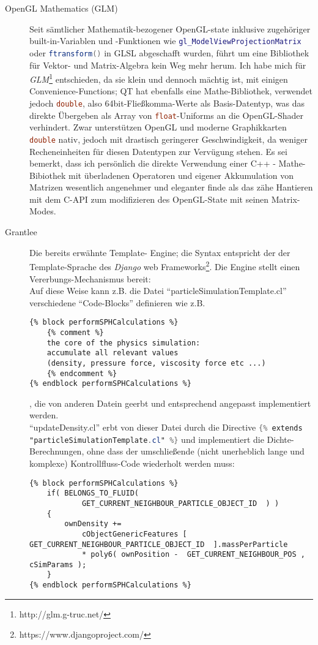 \begin{description}
    	
    	\item[OpenGL Mathematics (GLM)]
    	Seit sämtlicher Mathematik-bezogener OpenGL-state inklusive zugehöriger built-in-Variablen und -Funktionen
    	wie \lstinline[language=GLSL]|gl_ModelViewProjectionMatrix| oder
    	\lstinline[language=GLSL]|ftransform()|
    	in GLSL abgeschafft wurden, führt um eine Bibliothek für Vektor- und Matrix-Algebra kein Weg mehr herum.
    	Ich habe mich für \emph{GLM}\footnote{http://glm.g-truc.net/} entschieden, da sie klein und dennoch mächtig ist,
    	mit einigen Convenience-Functions; QT hat ebenfalls eine Mathe-Bibliothek, verwendet jedoch
    	\lstinline[language=C]|double|, also 64bit-Fließkomma-Werte als Basis-Datentyp, was das direkte Übergeben
    	als Array von \lstinline[language=C]|float|-Uniforms an die OpenGL-Shader verhindert. Zwar unterstützen OpenGL
    	und moderne Graphikkarten \lstinline[language=C]|double| nativ, jedoch mit drastisch geringerer Geschwindigkeit,
    	da weniger Recheneinheiten für diesen Datentypen zur Vervügung stehen.
    	Es sei bemerkt, dass ich persönlich die direkte Verwendung einer C++ - Mathe-Bibiothek mit überladenen Operatoren
    	und eigener Akkumulation von Matrizen wesentlich angenehmer und eleganter finde als das zähe Hantieren
    	mit dem C-API zum modifizieren des OpenGL-State mit seinen Matrix-Modes.
    	
    	\item[Grantlee]
       		Die bereits erwähnte Template- Engine; die Syntax entspricht der der Template-Sprache des 
       		\emph{Django} web Frameworks\footnote{https://www.djangoproject.com/}.
       		Die Engine stellt einen Vererbungs-Mechanismus bereit:\\
       		Auf diese Weise kann z.B. die Datei "`particleSimulationTemplate.cl"' verschiedene "`Code-Blocks"'
       		definieren wie z.B.
       		\lstset{language=GLSL} 
       		\begin{lstlisting}
{% block performSPHCalculations %}
	{% comment %}
	the core of the physics simulation: 
	accumulate all relevant values 
	(density, pressure force, viscosity force etc ...)
	{% endcomment %}               
{% endblock performSPHCalculations %}
       		\end{lstlisting}
       		, die von anderen Datein geerbt und entsprechend angepasst implementiert werden.\\
       		"`updateDensity.cl"' erbt von dieser Datei durch die Directive
       		\lstinline[language=GLSL]|{% extends "particleSimulationTemplate.cl" %}| 
       		und implementiert die Dichte-Berechnungen, 
       		ohne dass der umschließende (nicht unerheblich lange und komplexe) Kontrollfluss-Code wiederholt werden muss:
       		\begin{lstlisting}
{% block performSPHCalculations %}
	if( BELONGS_TO_FLUID(
			GET_CURRENT_NEIGHBOUR_PARTICLE_OBJECT_ID  ) )
	{
		ownDensity +=                   
			cObjectGenericFeatures [ GET_CURRENT_NEIGHBOUR_PARTICLE_OBJECT_ID  ].massPerParticle
			* poly6( ownPosition -  GET_CURRENT_NEIGHBOUR_POS , cSimParams );
	}
{% endblock performSPHCalculations %}
       		\end{lstlisting}


\end{description}
